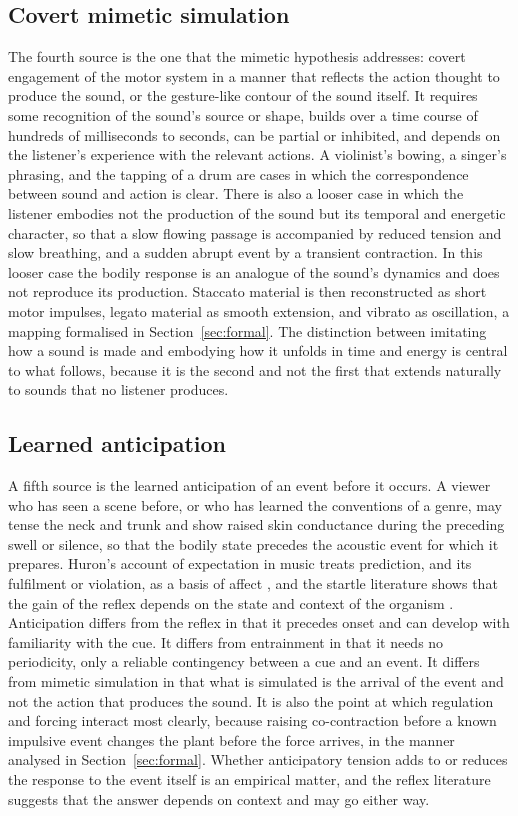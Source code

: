 \documentclass[11pt]{article}
\theoremstyle{plain}
\theoremstyle{definition}
\begin{document}
\subsection{Covert mimetic simulation}

The fourth source is the one that the mimetic hypothesis addresses: covert engagement of the motor system in a manner that reflects the action thought to produce the sound, or the gesture-like contour of the sound itself. It requires some recognition of the sound's source or shape, builds over a time course of hundreds of milliseconds to seconds, can be partial or inhibited, and depends on the listener's experience with the relevant actions. A violinist's bowing, a singer's phrasing, and the tapping of a drum are cases in which the correspondence between sound and action is clear. There is also a looser case in which the listener embodies not the production of the sound but its temporal and energetic character, so that a slow flowing passage is accompanied by reduced tension and slow breathing, and a sudden abrupt event by a transient contraction. In this looser case the bodily response is an analogue of the sound's dynamics and does not reproduce its production. Staccato material is then reconstructed as short motor impulses, legato material as smooth extension, and vibrato as oscillation, a mapping formalised in Section~\ref{sec:formal}. The distinction between imitating how a sound is made and embodying how it unfolds in time and energy is central to what follows, because it is the second and not the first that extends naturally to sounds that no listener produces.

\subsection{Learned anticipation}

A fifth source is the learned anticipation of an event before it occurs. A viewer who has seen a scene before, or who has learned the conventions of a genre, may tense the neck and trunk and show raised skin conductance during the preceding swell or silence, so that the bodily state precedes the acoustic event for which it prepares. Huron's account of expectation in music treats prediction, and its fulfilment or violation, as a basis of affect \citep{huron2006}, and the startle literature shows that the gain of the reflex depends on the state and context of the organism \citep{graham1975,lang1990}. Anticipation differs from the reflex in that it precedes onset and can develop with familiarity with the cue. It differs from entrainment in that it needs no periodicity, only a reliable contingency between a cue and an event. It differs from mimetic simulation in that what is simulated is the arrival of the event and not the action that produces the sound. It is also the point at which regulation and forcing interact most clearly, because raising co-contraction before a known impulsive event changes the plant before the force arrives, in the manner analysed in Section~\ref{sec:formal}. Whether anticipatory tension adds to or reduces the response to the event itself is an empirical matter, and the reflex literature suggests that the answer depends on context and may go either way.
\end{document}
